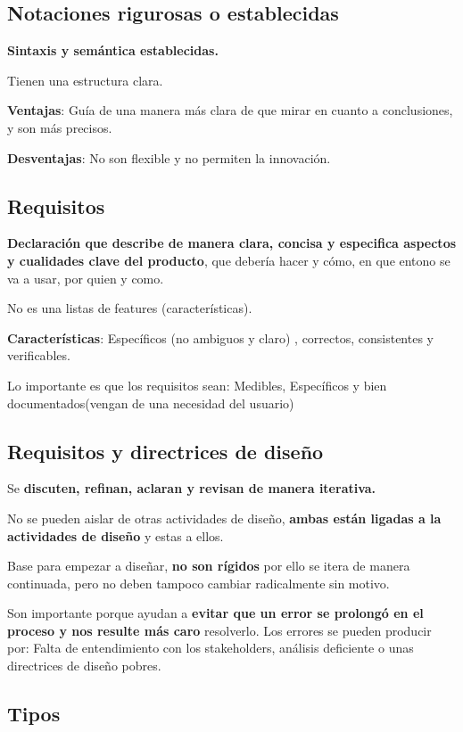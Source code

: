 \documentclass[12pt]{report} %
\begin{document}
\subsection{Notaciones rigurosas o establecidas}

\textbf{Sintaxis y semántica establecidas.}

Tienen una estructura clara.

\textbf{Ventajas}: Guía de una manera más clara de que mirar en cuanto a
conclusiones, y son más precisos.

\textbf{Desventajas}: No son flexible y no permiten la innovación.

\subsection{Requisitos}

\textbf{Declaración que describe de manera clara, concisa y especifica
aspectos y cualidades clave del producto}, que debería hacer y cómo, en
que entono se va a usar, por quien y como.

No es una listas de features (características).

\textbf{Características}: Específicos (no ambiguos y claro) , correctos,
consistentes y verificables.

Lo importante es que los requisitos sean: Medibles, Específicos y bien documentados(vengan de una necesidad del usuario)

\subsection{Requisitos y directrices de diseño}

Se \textbf{discuten, refinan, aclaran y revisan de manera iterativa.}

No se pueden aislar de otras actividades de diseño, \textbf{ambas están
ligadas a la actividades de diseño} y estas a ellos.

Base para empezar a diseñar, \textbf{no son rígidos} por ello se itera
de manera continuada, pero no deben tampoco cambiar radicalmente sin
motivo.

Son importante porque ayudan a \textbf{evitar que un error se prolongó
en el proceso y nos resulte más caro} resolverlo. Los errores se pueden
producir por: Falta de entendimiento con los stakeholders, análisis
deficiente o unas directrices de diseño pobres.

\subsection{Tipos}
\end{document}
